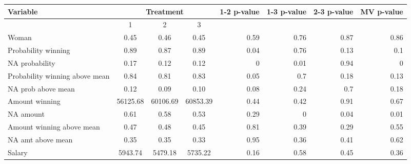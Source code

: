 \begin{tabular}{lccccccc}
\toprule
Variable & \multicolumn{3}{c}{Treatment} & 1-2 p-value & 1-3 p-value & 2-3 p-value & MV p-value \\
\midrule
\midrule
      & 1     & 2     & 3     &       &       &       &  \\
\midrule
Woman & 0.45  & 0.46  & 0.45  & \multicolumn{1}{r}{0.59} & \multicolumn{1}{r}{0.76} & \multicolumn{1}{r}{0.87} & \multicolumn{1}{r}{0.86} \\
Probability winning & 0.89  & 0.87  & 0.89  & \multicolumn{1}{r}{\cellcolor[rgb]{ .816,  .808,  .808} 0.04} & \multicolumn{1}{r}{0.76} & \multicolumn{1}{r}{0.13} & \multicolumn{1}{r}{0.1} \\
NA probability & 0.17  & 0.12  & 0.12  & \multicolumn{1}{r}{\cellcolor[rgb]{ .816,  .808,  .808} 0} & \multicolumn{1}{r}{\cellcolor[rgb]{ .816,  .808,  .808} 0.01} & \multicolumn{1}{r}{0.94} & \multicolumn{1}{r}{\cellcolor[rgb]{ .816,  .808,  .808} 0} \\
Probability winning above mean & 0.84  & 0.81  & 0.83  & \multicolumn{1}{r}{\cellcolor[rgb]{ .816,  .808,  .808} 0.05} & \multicolumn{1}{r}{0.7} & \multicolumn{1}{r}{0.18} & \multicolumn{1}{r}{0.13} \\
NA prob above mean & 0.12  & 0.09  & 0.10  & \multicolumn{1}{r}{\cellcolor[rgb]{ .816,  .808,  .808} 0.08} & \multicolumn{1}{r}{0.24} & \multicolumn{1}{r}{0.7} & \multicolumn{1}{r}{0.18} \\
Amount winning & 56125.68 & 60106.69 & 60853.39 & \multicolumn{1}{r}{0.44} & \multicolumn{1}{r}{0.42} & \multicolumn{1}{r}{0.91} & \multicolumn{1}{r}{0.67} \\
NA amount & 0.61  & 0.58  & 0.53  & \multicolumn{1}{r}{0.29} & \multicolumn{1}{r}{\cellcolor[rgb]{ .816,  .808,  .808} 0} & \multicolumn{1}{r}{\cellcolor[rgb]{ .816,  .808,  .808} 0.04} & \multicolumn{1}{r}{\cellcolor[rgb]{ .816,  .808,  .808} 0.01} \\
Amount winning above mean & 0.47  & 0.48  & 0.45  & \multicolumn{1}{r}{0.81} & \multicolumn{1}{r}{0.39} & \multicolumn{1}{r}{0.29} & \multicolumn{1}{r}{0.55} \\
NA amt above mean & 0.35  & 0.35  & 0.33  & \multicolumn{1}{r}{0.95} & \multicolumn{1}{r}{0.36} & \multicolumn{1}{r}{0.41} & \multicolumn{1}{r}{0.62} \\
Salary & 5943.74 & 5479.18 & 5735.22 & \multicolumn{1}{r}{0.16} & \multicolumn{1}{r}{0.58} & \multicolumn{1}{r}{0.45} & \multicolumn{1}{r}{0.36} \\

\end{tabular}
